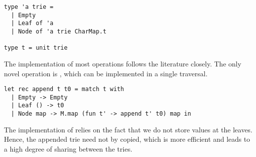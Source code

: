 \begin{lstlisting}
type 'a trie =
  | Empty
  | Leaf of 'a
  | Node of 'a trie CharMap.t

type t = unit trie
\end{lstlisting}

The implementation of most operations follows the literature
closely. The only novel operation is , which can be
implemented in a single traversal.

\begin{lstlisting}
let rec append t t0 = match t with
  | Empty -> Empty
  | Leaf () -> t0
  | Node map -> M.map (fun t' -> append t' t0) map in
\end{lstlisting}

The implementation of  relies on the fact that we do not store
values at the leaves. Hence, the appended trie  need not by
copied, which is more efficient and leads to a high degree of sharing between the tries.

